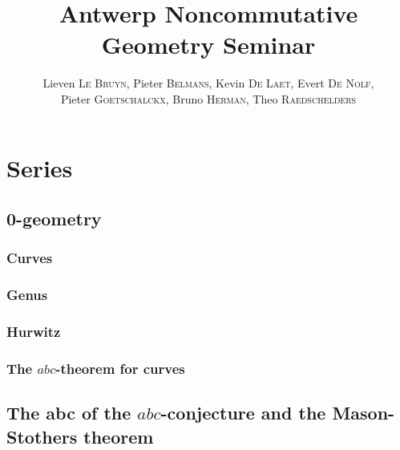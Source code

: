 \documentclass[a4paper]{memoir}
\begin{document}
\title{Antwerp Noncommutative Geometry Seminar}
\author{
  Lieven \textsc{Le Bruyn}, Pieter \textsc{Belmans}, Kevin \textsc{De Laet}, Evert \textsc{De Nolf}, \\
  Pieter \textsc{Goetschalckx}, Bruno \textsc{Herman}, Theo \textsc{Raedschelders}}
\maketitle

\tableofcontents*

\part{Series}

\chapter{0-geometry}
\section{Curves}
\section{Genus}
\section{Hurwitz}
\section{The $abc$-theorem for curves}



\chapter{The abc of the $abc$-conjecture and the Mason-Stothers theorem}



\end{document}
